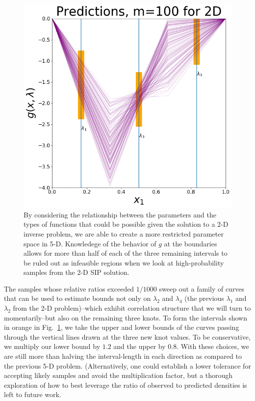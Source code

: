\begin{figure}[htbp]
\centering
  \includegraphics[width=0.675\linewidth]{figures/pde-highd/pde-highd-alt_initial_D5_m100.png}
\caption{
By considering the relationship between the parameters and the types of functions that could be possible given the solution to a 2-D inverse problem, we are able to create a more restricted parameter space in 5-D.
Knowledege of the behavior of $g$ at the boundaries allows for more than half of each of the three remaining intervals to be ruled out as infeasible regions when we look at high-probability samples from the 2-D SIP solution.
}
\label{fig:pde-highd-5d-study}
\end{figure}

The samples whose relative ratios exceeded $1/1000$ sweep out a family of curves that can be used to estimate bounds not only on $\lambda_2$ and $\lambda_4$ (the previous $\lambda_1$ and $\lambda_2$ from the 2-D problem)\---which exhibit correlation structure that we will turn to momentarily\---but also on the remaining three knots.
To form the intervals shown in orange in Fig.~\ref{fig:pde-highd-5d-study}, we take the upper and lower bounds of the curves passing through the vertical lines drawn at the three new knot values.
To be conservative, we multiply our lower bound by $1.2$ and the upper by $0.8$.
With these choices, we are still more than halving the interval-length in each direction as compared to the previous 5-D problem.
(Alternatively, one could establish a lower tolerance for accepting likely samples and avoid the multiplication factor, but a thorough exploration of how to best leverage the ratio of observed to predicted densities is left to future work.


\FloatBarrier

